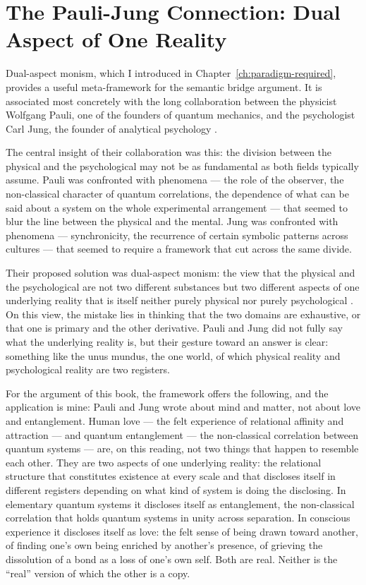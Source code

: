 \section{The Pauli-Jung Connection: Dual Aspect of One Reality}
\label{sec:ch14-pauli-jung}

Dual-aspect monism, which I introduced in Chapter~\ref{ch:paradigm-required}, provides a useful meta-framework for the semantic bridge argument. It is associated most concretely with the long collaboration between the physicist Wolfgang Pauli, one of the founders of quantum mechanics, and the psychologist Carl Jung, the founder of analytical psychology \citep{PauliJung2001}.

The central insight of their collaboration was this: the division between the physical and the psychological may not be as fundamental as both fields typically assume. Pauli was confronted with phenomena — the role of the observer, the non-classical character of quantum correlations, the dependence of what can be said about a system on the whole experimental arrangement — that seemed to blur the line between the physical and the mental. Jung was confronted with phenomena — synchronicity, the recurrence of certain symbolic patterns across cultures — that seemed to require a framework that cut across the same divide.

Their proposed solution was dual-aspect monism: the view that the physical and the psychological are not two different substances but two different aspects of one underlying reality that is itself neither purely physical nor purely psychological \citep{PauliJung2001, AtmanspacherPrimas2006}. On this view, the mistake lies in thinking that the two domains are exhaustive, or that one is primary and the other derivative. Pauli and Jung did not fully say what the underlying reality is, but their gesture toward an answer is clear: something like the unus mundus, the one world, of which physical reality and psychological reality are two registers.

For the argument of this book, the framework offers the following, and the application is mine: Pauli and Jung wrote about mind and matter, not about love and entanglement. Human love — the felt experience of relational affinity and attraction — and quantum entanglement — the non-classical correlation between quantum systems — are, on this reading, not two things that happen to resemble each other. They are two aspects of one underlying reality: the relational structure that constitutes existence at every scale and that discloses itself in different registers depending on what kind of system is doing the disclosing. In elementary quantum systems it discloses itself as entanglement, the non-classical correlation that holds quantum systems in unity across separation. In conscious experience it discloses itself as love: the felt sense of being drawn toward another, of finding one's own being enriched by another's presence, of grieving the dissolution of a bond as a loss of one's own self. Both are real. Neither is the ``real'' version of which the other is a copy.

